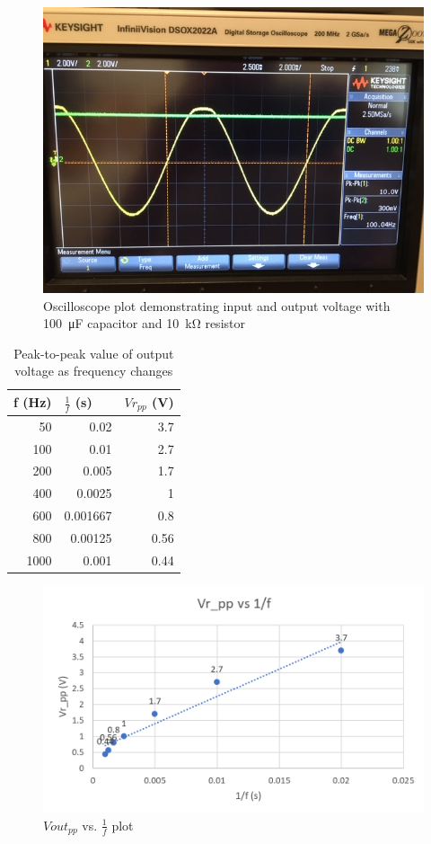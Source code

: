 \documentclass{article}
\begin{document}
\begin{figure}[H]
  \centering
  \includegraphics[width=\textwidth]{image/Part2/100u10k.JPG}
  \caption{Oscilloscope plot demonstrating input and output voltage with \SI{100}{\micro\farad} capacitor and \SI{10}{\kilo\ohm} resistor}
\end{figure}

\begin{table}[H]
  \centering
    \begin{tabular}{rrr}
      \toprule
      \multicolumn{1}{l}{f (Hz)} & \multicolumn{1}{l}{$\frac{1}{f}$ (s)} & \multicolumn{1}{l}{$Vr_{pp}$ (V)} \\
      \midrule
      50    & 0.02  & 3.7 \\
      100   & 0.01  & 2.7 \\
      200   & 0.005 & 1.7 \\
      400   & 0.0025 & 1 \\
      600   & 0.001667 & 0.8 \\
      800   & 0.00125 & 0.56 \\
      1000  & 0.001 & 0.44 \\
      \bottomrule
  \end{tabular}%
    \caption{Peak-to-peak value of output voltage as frequency changes}
\end{table}%

\begin{figure}[H]
  \centering
  \includegraphics[width=\textwidth]{image/Part2/plot.png}
  \caption{$Vout_{pp}$ vs. $\frac{1}{f}$ plot}
\end{figure}
\end{document}
